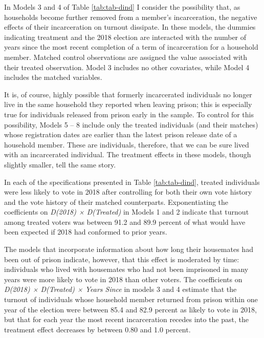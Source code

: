 \documentclass[
  12pt,
]{article}
\begin{document}
In Models 3 and 4 of Table \ref{tab:tab-dind} I consider the possibility that, as households become further removed from a member's incarceration, the negative effects of their incarceration on turnout dissipate. In these models, the dummies indicating treatment and the 2018 election are interacted with the number of years since the most recent completion of a term of incarceration for a household member. Matched control observations are assigned the value associated with their treated observation. Model 3 includes no other covariates, while Model 4 includes the matched variables.

It is, of course, highly possible that formerly incarcerated individuals no longer live in the same household they reported when leaving prison; this is especially true for individuals released from prison early in the sample. To control for this possibility, Models 5 -- 8 include only the treated individuals (and their matches) whose registration dates are earlier than the latest prison release date of a household member. These are individuals, therefore, that we can be sure lived with an incarcerated individual. The treatment effects in these models, though slightly smaller, tell the same story.

\begin{singlespace}

\end{singlespace}

In each of the specifications presented in Table \ref{tab:tab-dind}, treated individuals were less likely to vote in 2018 after controlling for both their own vote history and the vote history of their matched counterparts. Exponentiating the coefficients on \emph{D(2018) × D(Treated)} in Models 1 and 2 indicate that turnout among treated voters was between 91.2 and 89.9 percent of what would have been expected if 2018 had conformed to prior years.

The models that incorporate information about how long their housemates had been out of prison indicate, however, that this effect is moderated by time: individuals who lived with housemates who had not been imprisoned in many years were more likely to vote in 2018 than other voters. The coefficients on \emph{D(2018) × D(Treated) × Years Since} in models 3 and 4 estimate that the turnout of individuals whose household member returned from prison within one year of the election were between 85.4 and 82.9 percent as likely to vote in 2018, but that for each year the most recent incarceration recedes into the past, the treatment effect decreases by between 0.80 and 1.0 percent.
\end{document}
